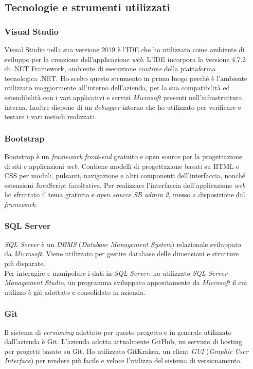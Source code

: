 \subsection{Tecnologie e strumenti utilizzati}

\subsubsection{Visual Studio}
Visual Studio nella sua versione 2019 è l'IDE che ho utilizzato come ambiente di sviluppo per la creazione dell'applicazione \textit{web}. L'IDE incorpora la versione 4.7.2 di .NET Framework, ambiente di esecuzione \textit{runtime} della piattaforma tecnologica .NET.
Ho scelto questo strumento in primo luogo perché è l'ambiente utilizzato maggiormente all'interno dell'azienda, per la sua compatibilità ed estendibilità con i vari applicativi e servizi \textit{Microsoft} presenti nell'infrastruttura interna. Inoltre dispone di un \textit{debugger} interno che ho utilizzato per verificare e testare i vari metodi realizzati.
\newpage
\subsubsection{Bootstrap}
Bootstrap è un \textit{framework} \textit{front-end} gratuito e open source per la progettazione di
siti e applicazioni \textit{web}. Contiene modelli di progettazione basati su HTML e
CSS per moduli, pulsanti, navigazione e altri componenti dell'interfaccia, nonché
estensioni JavaScript facoltative. Per realizzare l'interfaccia dell'applicazione \textit{web} ho sfruttato il tema gratuito e \textit{open source} \textit{SB admin 2}, messo a disposizione dal \textit{framework}.

\subsubsection{SQL Server}
\textit{SQL Server} è un \textit{DBMS} (\textit{Database Management System}) relazionale sviluppato da \textit{Microsoft}. Viene utilizzato per gestire database delle dimensioni e strutture più disparate.\\
Per interagire e manipolare i dati in \textit{SQL Server}, ho utilizzato \textit{SQL Server Management Studio}, un programma sviluppato appositamente da \textit{Microsoft} il cui utilizzo è già adottato e consolidato in azienda.

\subsubsection{Git}
Il sistema di \textit{versioning} adottato per questo progetto e in generale utilizzato dall'azienda è Git.
L'azienda adotta attualmente GitHub, un servizio di hosting per progetti basato su Git.
Ho utilizzato GitKraken, un client \textit{GUI} (\textit{Graphic User Interface}) per rendere più facile e veloce l'utilizzo del sistema di versionamento.

